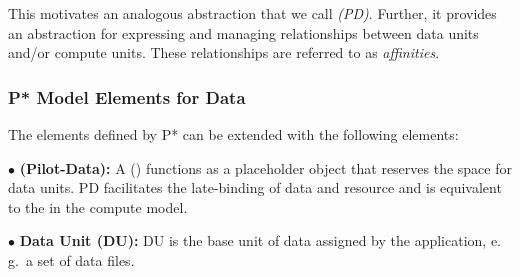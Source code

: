 \documentclass[conference]{IEEEtran}
\begin{document}


This motivates an analogous abstraction that we call \emph{\pilotdata
  (PD)}.  Further, it provides an abstraction for expressing and
managing relationships between data units and/or compute units. These
relationships are referred to as \emph{affinities}.


\subsubsection*{P* Model Elements for Data}


The elements defined by P* can be extended with the following elements:


\noindent$\bullet$
  \textbf{\pilot (Pilot-Data):} A \pilotdata (\pd) functions as a 
	placeholder object that reserves the space
	for data units. PD facilitates the late-binding of data and resource and is
	equivalent to the \pilot in the compute model.

\noindent$\bullet$
  \textbf{Data Unit (DU):} DU is the base unit of data assigned by
  the application,  e.\,g.\ a set of data files. 

\end{document}
